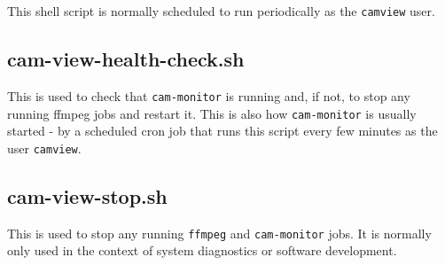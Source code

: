     This shell script is normally scheduled to run periodically as
    the \texttt{camview} user.

  \subsection{cam-view-health-check.sh}

    This is used to check that \texttt{cam-monitor} is running and, if
    not, to stop any running ffmpeg jobs and restart it.  This is also
    how \texttt{cam-monitor} is usually started - by a scheduled cron job
    that runs this script every few minutes as the user \texttt{camview}.

  \subsection{cam-view-stop.sh}

    This is used to stop any running \texttt{ffmpeg} and
    \texttt{cam-monitor} jobs.  It is normally only used in the context
    of system diagnostics or \PRODUCT{} software development.
